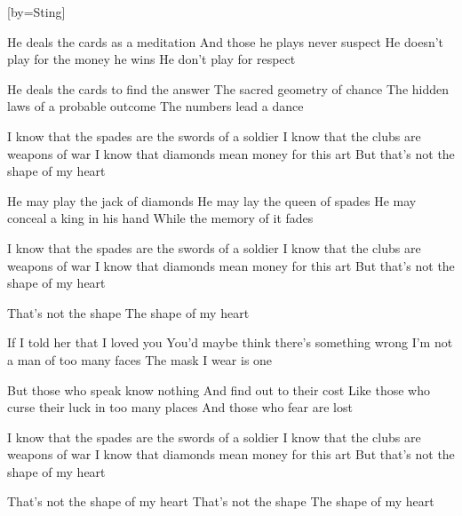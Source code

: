 [by={Sting}]

  \beginverse
  He deals the cards as a meditation
  And those he plays never suspect
  He doesn't play for the money he wins
  He don't play for respect
  \endverse

  \beginverse
  He deals the cards to find the answer
  The sacred geometry of chance
  The hidden laws of a probable outcome
  The numbers lead a dance
  \endverse

  \beginverse
  I know that the spades are the swords of a soldier
  I know that the clubs are weapons of war
  I know that diamonds mean money for this art
  But that's not the shape of my heart
  \endverse

  \beginverse
  He may play the jack of diamonds
  He may lay the queen of spades
  He may conceal a king in his hand
  While the memory of it fades
  \endverse

  \beginverse
  I know that the spades are the swords of a soldier
  I know that the clubs are weapons of war
  I know that diamonds mean money for this art
  But that's not the shape of my heart
  \endverse

  \beginverse
  That's not the shape
  The shape of my heart
  \endverse

  \beginverse
  If I told her that I loved you
  You'd maybe think there's something wrong
  I'm not a man of too many faces
  The mask I wear is one
  \endverse

  \beginverse
  But those who speak know nothing
  And find out to their cost
  Like those who curse their luck in too many places
  And those who fear are lost
  \endverse

  \beginverse
  I know that the spades are the swords of a soldier
  I know that the clubs are weapons of war
  I know that diamonds mean money for this art
  But that's not the shape of my heart
  \endverse

  \beginverse
  That's not the shape of my heart
  That's not the shape
  The shape of my heart
  \endverse
\endsong
